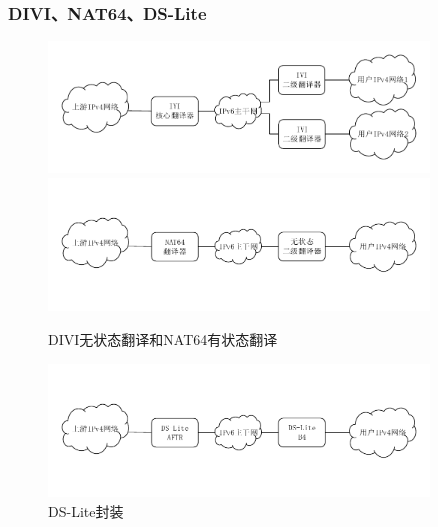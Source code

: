 \documentclass{beamer}
\begin{document}
\begin{frame}
  \frametitle{DIVI、NAT64、DS-Lite}

  \vspace{-1.5em}
  \begin{figure}
    \includegraphics[width=0.9\textwidth]{figs/5-divi.pdf}\\
    \vspace{-3.5em}
    \includegraphics[width=0.9\textwidth]{figs/7-nat64.pdf}\\
    \vspace{-4em}
    \caption{\tiny DIVI无状态翻译和NAT64有状态翻译}
    \vspace{-2em}
    \includegraphics[width=0.9\textwidth]{figs/8-ds-lite.pdf}
    \vspace{-4em}
    \caption{\tiny DS-Lite封装}
  \end{figure}
\end{frame}
\end{document}
